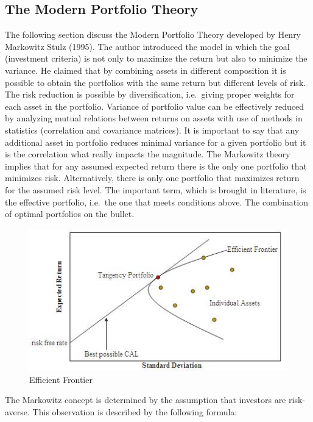 \documentclass[]{article}
\begin{document}
\subsection{The Modern Portfolio
Theory}\label{the-modern-portfolio-theory}

The following section discuss the Modern Portfolio Theory developed by
Henry Markowitz Stulz (1995). The author introduced the model in which
the goal (investment criteria) is not only to maximize the return but
also to minimize the variance. He claimed that by combining assets in
different composition it is possible to obtain the portfolios with the
same return but different levels of risk. The risk reduction is possible
by diversification, i.e.~giving proper weights for each asset in the
portfolio. Variance of portfolio value can be effectively reduced by
analyzing mutual relations between returns on assets with use of methods
in statistics (correlation and covariance matrices). It is important to
say that any additional asset in portfolio reduces minimal variance for
a given portfolio but it is the correlation what really impacts the
magnitude. The Markowitz theory implies that for any assumed expected
return there is the only one portfolio that minimizes risk.
Alternatively, there is only one portfolio that maximizes return for the
assumed risk level. The important term, which is brought in literature,
is the effective portfolio, i.e.~the one that meets conditions above.
The combination of optimal portfolios on the bullet.

\begin{figure}
\centering
\includegraphics{../img/markowitz_frontier.jpg}
\caption{Efficient Frontier}
\end{figure}

The Markowitz concept is determined by the assumption that investors are
risk-averse. This observation is described by the following formula:
\end{document}
